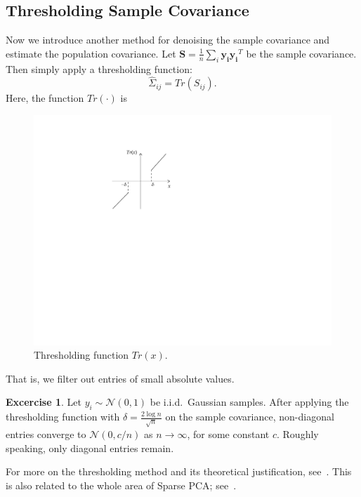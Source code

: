 \documentclass[11pt]{article}
\theoremstyle{definition}
\newtheorem{excercise}{Excercise}
\begin{document}
\subsection{Thresholding Sample Covariance}
Now we introduce another method for denoising the sample covariance and estimate the population covariance. Let $\mathbf{S}= \frac{1}{n}\sum_{i}\mathbf{y_i}\mathbf{y_i}^T$ be the sample covariance. Then simply apply a thresholding function: $$\widehat{\Sigma}_{ij} = Tr(S_{ij}).$$ Here, the function $Tr(\cdot)$ is 
\begin{figure}[htbp]
    \centering
    \includegraphics[scale=.85]{./fig/tr.pdf}
    \caption{Thresholding function $Tr(x)$.}
\end{figure}

That is, we filter out entries of small absolute values.
\begin{excercise}
    Let $y_i\sim \mathcal{N}(0,1)$ be i.i.d.\ Gaussian samples. After applying the thresholding function with $\delta = \frac{2\log n}{\sqrt{n}}$ on the sample covariance,  non-diagonal entries converge to $\mathcal{N}(0,c/n)$ as $n\rightarrow \infty$, for some constant $c$. Roughly speaking, only diagonal entries remain.
\end{excercise}

For more on the thresholding method and its theoretical justification, see~\cite{bickel2008covariance}. This is also related to the whole area of Sparse PCA; see~\cite{johnstone2009consistency}.
\end{document}
